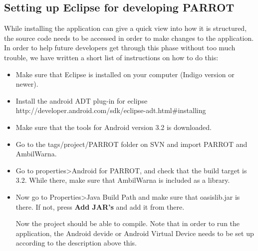\subsection{Setting up Eclipse for developing PARROT}
While installing the application can give a quick view into how it is structured, the source code needs to be accessed in order to make changes to the application.
In order to help future developers get through this phase without too much trouble, we have written a short list of instructions on how to do this:
\begin{itemize}
	\item Make sure that Eclipse is installed on your computer (Indigo version or newer).
	\item Install the android ADT plug-in for eclipse http://developer.android.com/sdk/eclipse-adt.html\#installing
	\item Make sure that the tools for Android version 3.2 is downloaded.
	\item Go to the tags/project/PARROT folder on SVN and import PARROT and AmbilWarna.
	\item Go to properties>Android for PARROT, and check that the build target is 3.2.
		\subitem While there, make sure that AmbilWarna is included as a library.
	\item Now go to Properties>Java Build Path and make sure that oasislib.jar is there. If not, press \textbf{Add JAR's} and add it from there.

Now the project should be able to compile. Note that in order to run the application, the Android devide or Android Virtual Device needs to be set up according to the description above this.
	
\end{itemize}